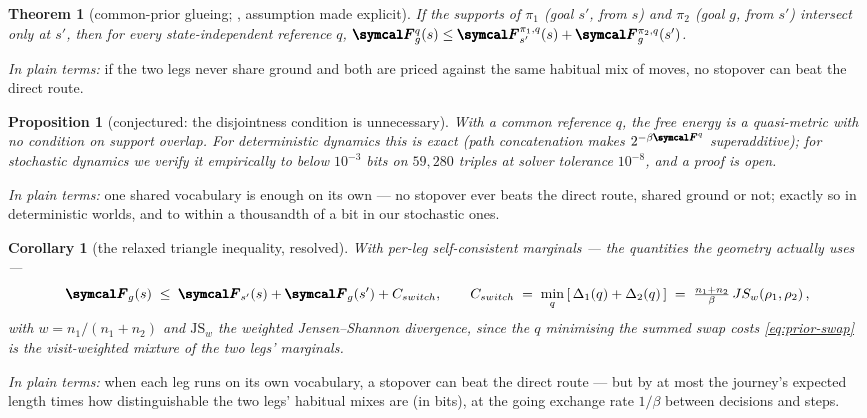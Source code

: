 \documentclass[a4paper, notitlepage, 11pt]{article}
\theoremstyle{plain}
\newtheorem{theorem}{Theorem}
\newtheorem{proposition}{Proposition}
\newtheorem{corollary}{Corollary}
\begin{document}
\begin{theorem}[common-prior glueing; \citealp{Archer2022-space-of-goals},
assumption made explicit]
\label{thm:common-prior}
If the supports of $\pi_1$ (goal $s'$, from $s$) and $\pi_2$ (goal $g$,
from $s'$) intersect only at $s'$, then for every state-independent
reference $q$,
$\Fen^{q}_g(s) \leq \Fen^{\pi_1, q}_{s'}(s) + \Fen^{\pi_2, q}_g(s')$.
\end{theorem}

\noindent\emph{In plain terms:} if the two legs never share ground and
both are priced against the same habitual mix of moves, no stopover can
beat the direct route.

\begin{proposition}[conjectured: the disjointness condition is
unnecessary]
\label{prop:no-disjointness}
With a common reference $q$, the free energy is a quasi-metric with no
condition on support overlap.  For deterministic dynamics this is exact
(path concatenation makes $2^{-\beta \Fen^{q}}$ superadditive); for
stochastic dynamics we verify it empirically to below $10^{-3}$ bits on
$59{,}280$ triples at solver tolerance $10^{-8}$, and a proof is open.
\end{proposition}

\noindent\emph{In plain terms:} one shared vocabulary is enough on its
own --- no stopover ever beats the direct route, shared ground or not;
exactly so in deterministic worlds, and to within a thousandth of a bit
in our stochastic ones.

\begin{corollary}[the relaxed triangle inequality, resolved]
\label{cor:relaxed}
With per-leg self-consistent marginals --- the quantities the geometry
actually uses ---
\[
  \Fen_g(s) \;\leq\; \Fen_{s'}(s) + \Fen_g(s') + C_{\mathrm{switch}},
  \qquad
  C_{\mathrm{switch}} \;=\; \min_q\, [\, \Delta_1(q) + \Delta_2(q) \,]
  \;=\; \tfrac{n_1 + n_2}{\beta}\,
  \mathrm{JS}_w\!\left( \rho_1, \rho_2 \right),
\]
with $w = n_1 / (n_1 + n_2)$ and $\mathrm{JS}_w$ the weighted
Jensen--Shannon divergence, since the $q$ minimising the summed
swap costs \eqref{eq:prior-swap} is the visit-weighted mixture of the
two legs' marginals.
\end{corollary}

\noindent\emph{In plain terms:} when each leg runs on its own
vocabulary, a stopover can beat the direct route --- but by at most the
journey's expected length times how distinguishable the two legs'
habitual mixes are (in bits), at the going exchange rate $1/\beta$
between decisions and steps.
\end{document}
